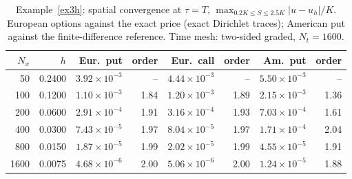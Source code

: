 \begin{table}[htbp]
\centering
\footnotesize
\caption{Example~\ref{ex3h}: spatial convergence at $\tau=T$, $\max_{0.2K\le S\le2.5K}|u-u_h|/K$. European options against the exact price (exact Dirichlet traces); American put against the finite-difference reference.  Time mesh: two-sided graded, $N_t=1600$.}
\label{tab:ex1_space}
\begin{tabular}{rrrrrrrr}
\toprule
$N_x$ & $h$ & Eur.\ put & order & Eur.\ call & order & Am.\ put & order \\
\midrule
50 & 0.2400 & $3.92\times10^{-3}$ & -- & $4.44\times10^{-3}$ & -- & $5.50\times10^{-3}$ & -- \\
100 & 0.1200 & $1.10\times10^{-3}$ & 1.84 & $1.20\times10^{-3}$ & 1.89 & $2.15\times10^{-3}$ & 1.36 \\
200 & 0.0600 & $2.91\times10^{-4}$ & 1.91 & $3.16\times10^{-4}$ & 1.93 & $7.03\times10^{-4}$ & 1.61 \\
400 & 0.0300 & $7.43\times10^{-5}$ & 1.97 & $8.04\times10^{-5}$ & 1.97 & $1.71\times10^{-4}$ & 2.04 \\
800 & 0.0150 & $1.87\times10^{-5}$ & 1.99 & $2.02\times10^{-5}$ & 1.99 & $4.55\times10^{-5}$ & 1.91 \\
1600 & 0.0075 & $4.68\times10^{-6}$ & 2.00 & $5.06\times10^{-6}$ & 2.00 & $1.24\times10^{-5}$ & 1.88 \\
\bottomrule
\end{tabular}
\end{table}
